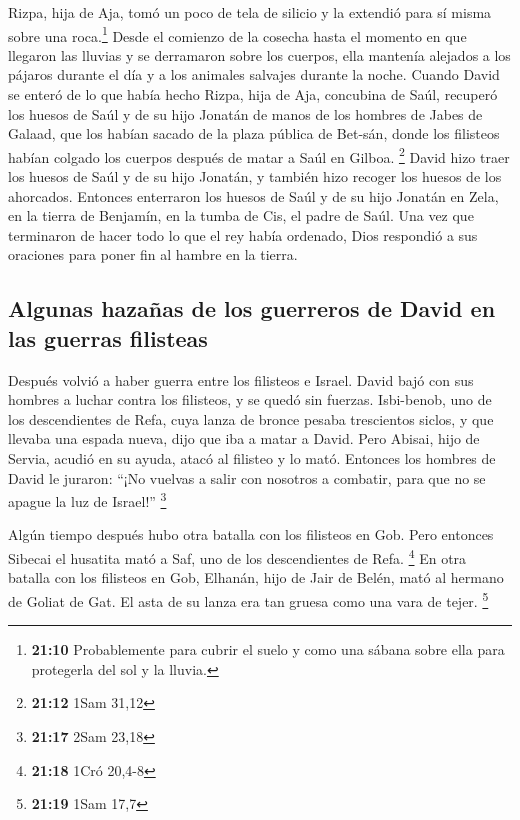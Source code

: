  Rizpa, hija de Aja, tomó un poco de tela de silicio y la
extendió para sí misma sobre una roca.\footnote{\textbf{21:10}
  Probablemente para cubrir el suelo y como una sábana sobre ella para
  protegerla del sol y la lluvia.} Desde el comienzo de la cosecha hasta
el momento en que llegaron las lluvias y se derramaron sobre los
cuerpos, ella mantenía alejados a los pájaros durante el día y a los
animales salvajes durante la noche.  Cuando David se
enteró de lo que había hecho Rizpa, hija de Aja, concubina de Saúl,
 recuperó los huesos de Saúl y de su hijo Jonatán de
manos de los hombres de Jabes de Galaad, que los habían sacado de la
plaza pública de Bet-sán, donde los filisteos habían colgado los cuerpos
después de matar a Saúl en Gilboa. \footnote{\textbf{21:12} 1Sam 31,12}
 David hizo traer los huesos de Saúl y de su hijo
Jonatán, y también hizo recoger los huesos de los ahorcados.
 Entonces enterraron los huesos de Saúl y de su hijo
Jonatán en Zela, en la tierra de Benjamín, en la tumba de Cis, el padre
de Saúl. Una vez que terminaron de hacer todo lo que el rey había
ordenado, Dios respondió a sus oraciones para poner fin al hambre en la
tierra.

\hypertarget{algunas-hazauxf1as-de-los-guerreros-de-david-en-las-guerras-filisteas}{%
\subsection{Algunas hazañas de los guerreros de David en las guerras
filisteas}\label{algunas-hazauxf1as-de-los-guerreros-de-david-en-las-guerras-filisteas}}

 Después volvió a haber guerra entre los filisteos e
Israel. David bajó con sus hombres a luchar contra los filisteos, y se
quedó sin fuerzas.  Isbi-benob, uno de los descendientes
de Refa, cuya lanza de bronce pesaba trescientos siclos, y que llevaba
una espada nueva, dijo que iba a matar a David.  Pero
Abisai, hijo de Servia, acudió en su ayuda, atacó al filisteo y lo mató.
Entonces los hombres de David le juraron: ``¡No vuelvas a salir con
nosotros a combatir, para que no se apague la luz de Israel!''
\footnote{\textbf{21:17} 2Sam 23,18}

 Algún tiempo después hubo otra batalla con los filisteos
en Gob. Pero entonces Sibecai el husatita mató a Saf, uno de los
descendientes de Refa. \footnote{\textbf{21:18} 1Cró 20,4-8}
 En otra batalla con los filisteos en Gob, Elhanán, hijo
de Jair de Belén, mató al hermano de Goliat de Gat. El asta de su lanza
era tan gruesa como una vara de tejer. \footnote{\textbf{21:19} 1Sam
  17,7}

